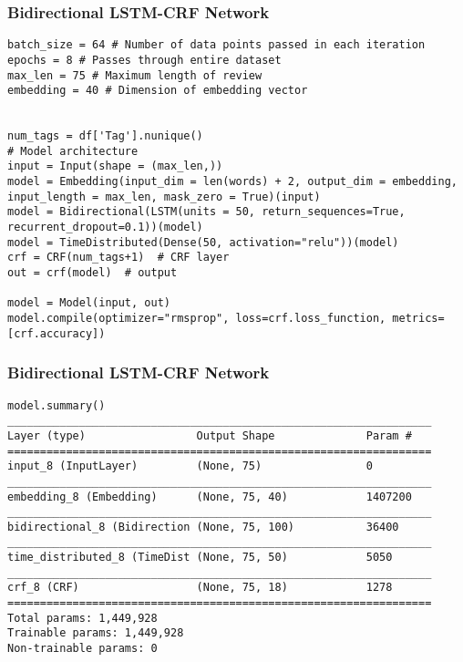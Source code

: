 \begin{frame}[fragile]\frametitle{Bidirectional LSTM-CRF Network}
\begin{lstlisting}
batch_size = 64 # Number of data points passed in each iteration
epochs = 8 # Passes through entire dataset
max_len = 75 # Maximum length of review
embedding = 40 # Dimension of embedding vector


num_tags = df['Tag'].nunique()
# Model architecture
input = Input(shape = (max_len,))
model = Embedding(input_dim = len(words) + 2, output_dim = embedding, input_length = max_len, mask_zero = True)(input)
model = Bidirectional(LSTM(units = 50, return_sequences=True, recurrent_dropout=0.1))(model)
model = TimeDistributed(Dense(50, activation="relu"))(model)
crf = CRF(num_tags+1)  # CRF layer
out = crf(model)  # output

model = Model(input, out)
model.compile(optimizer="rmsprop", loss=crf.loss_function, metrics=[crf.accuracy])
\end{lstlisting}
\end{frame}

\begin{frame}[fragile]\frametitle{Bidirectional LSTM-CRF Network}
\begin{lstlisting}
model.summary()
_________________________________________________________________
Layer (type)                 Output Shape              Param #   
=================================================================
input_8 (InputLayer)         (None, 75)                0         
_________________________________________________________________
embedding_8 (Embedding)      (None, 75, 40)            1407200   
_________________________________________________________________
bidirectional_8 (Bidirection (None, 75, 100)           36400     
_________________________________________________________________
time_distributed_8 (TimeDist (None, 75, 50)            5050      
_________________________________________________________________
crf_8 (CRF)                  (None, 75, 18)            1278      
=================================================================
Total params: 1,449,928
Trainable params: 1,449,928
Non-trainable params: 0
\end{lstlisting}
\end{frame}

